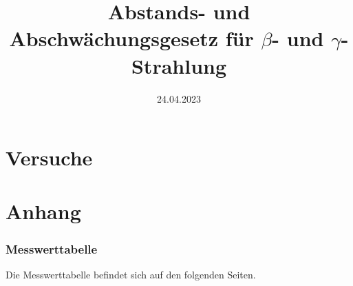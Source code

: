 
\usepackage{isotope}

\title{Abstands- und Abschwächungsgesetz für $\beta$- und $\gamma$-Strahlung}
\date{24.04.2023}


\maketitle


\newpage

\newpage
\part{Versuche}

\newpage

\newpage

\newpage

\newpage
\part{Anhang}
\printbibliography[heading=bibnumbered,title=Referenzen und Literatur]
\newpage
\section{Messwerttabelle}
Die Messwerttabelle befindet sich auf den folgenden Seiten.

